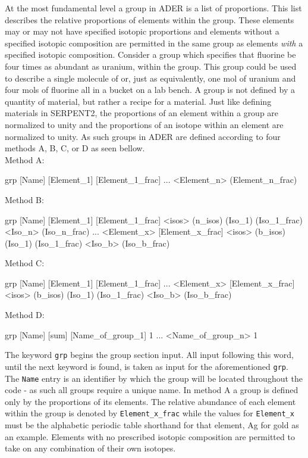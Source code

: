 At the most fundamental level a group in ADER is a list of proportions. This
list describes the relative proportions of elements within the group. These
elements may or may not have specified isotopic proportions and elements
without a specified isotopic composition are permitted in the same group as
elements \textit{with} a specified isotopic composition. Consider a group which
specifies that fluorine be four times as abundant as uranium, within the group.
This group could be used to describe a single molecule of  or, just as
equivalently, one mol of uranium and four mols of fluorine all in a bucket
on a lab bench. A group is not defined by a quantity of material, but rather
a recipe for a material. Just like defining materials in SERPENT2, the
proportions of an element within a group are normalized to unity and the
proportions of an isotope within an element are normalized to unity.
As such groups in ADER are defined according to four
methods A, B, C, or D as seen bellow.\\

\noindent Method A: 
\begin{lt}
grp [Name] 
[Element_1] [Element_1_frac] 
... 
<Element_n> (Element_n_frac)
\end{lt}

\noindent Method B:
\begin{lt}
grp [Name] 
[Element_1] [Element_1_frac] <isos> (n_isos)
(Iso_1) (Iso_1_frac)
<Iso_n> (Iso_n_frac)
...
<Element_x> [Element_x_frac] <isos> (b_isos)
(Iso_1) (Iso_1_frac)
<Iso_b> (Iso_b_frac)
\end{lt}

\noindent Method C:
\begin{lt}
grp [Name] 
[Element_1] [Element_1_frac] 
...
<Element_x> [Element_x_frac] <isos> (b_isos)
(Iso_1) (Iso_1_frac)
<Iso_b> (Iso_b_frac)
\end{lt}

\noindent Method D:
\begin{lt}
grp [Name] [sum]
[Name_of_group_1] 1
...
<Name_of_group_n> 1
\end{lt}

The keyword \texttt{grp} begins the group section input. All input following 
this word, until the next keyword is found, is taken as input for the
aforementioned \texttt{grp}.
The \texttt{Name} entry is an identifier by which the group will be located
throughout the code - as such all groups require a unique name.
In method A a group is defined only by the proportions of its elements. 
The relative abundance of each element within the group is denoted by
\texttt{Element\_x\_frac} while the values for \texttt{Element\_x} must be
the alphabetic periodic table shorthand for that element, Ag for gold as an
example. Elements with no prescribed isotopic composition are permitted to take
on any combination of their own isotopes.

